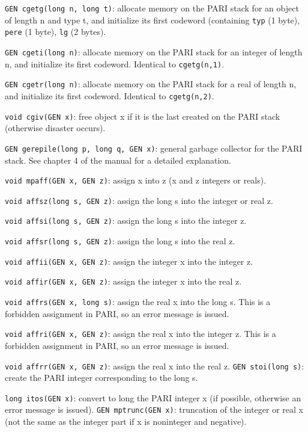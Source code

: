 {\tt GEN cgetg(long n, long t)}: allocate memory on the PARI stack for an
object of length n and type t, and initialize its first codeword (containing
{\tt typ} (1 byte), {\tt pere} (1 byte), {\tt lg} (2 bytes).

{\tt GEN cgeti(long n)}: allocate memory on the PARI stack for an integer
of length n, and initialize its first codeword. Identical to {\tt cgetg(n,1)}.

{\tt GEN cgetr(long n)}: allocate memory on the PARI stack for a real
of length n, and initialize its first codeword. Identical to {\tt cgetg(n,2)}.

{\tt void cgiv(GEN x)}: free object x if it is the last created on the PARI
stack (otherwise disaster occurs).

{\tt GEN gerepile(long p, long q, GEN x)}: general garbage collector for the
PARI stack. See chapter 4 of the manual for a detailed explanation.


{\tt void mpaff(GEN x, GEN z)}: assign x into z (x and z integers or reals).

{\tt void affsz(long s, GEN z)}: assign the long s into the integer or real z.

{\tt void affsi(long s, GEN z)}: assign the long s into the integer z.

{\tt void affsr(long s, GEN z)}: assign the long s into the real z.

{\tt void affii(GEN x, GEN z)}: assign the integer x into the integer z.

{\tt void affir(GEN x, GEN z)}: assign the integer x into the real z.

{\tt void affrs(GEN x, long s)}: assign the real x into the long s. This is a
forbidden assignment in PARI, so an error message is issued.

{\tt void affri(GEN x, GEN z)}: assign the real x into the integer z. This is a
forbidden assignment in PARI, so an error message is issued.

{\tt void affrr(GEN x, GEN z)}: assign the real x into the real z.
\smallskip
{\tt GEN stoi(long s)}: create the PARI integer corresponding to the long s.

{\tt long itos(GEN x)}: convert to long the PARI integer x (if possible,
otherwise an error message is issued).
\smallskip
{\tt GEN mptrunc(GEN x)}: truncation of the integer or real x (not the same
as the integer part if x is noninteger and negative).

